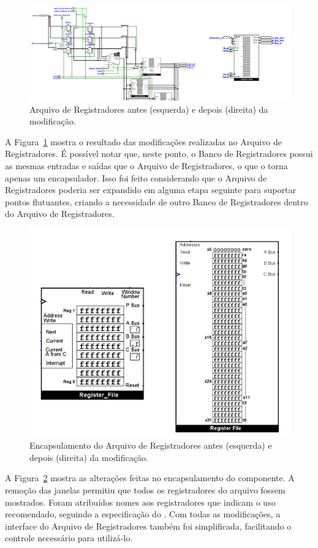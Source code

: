 \documentclass[
	12pt,				%
	openright,			%
	oneside,			%
	a4paper,			%
	english,			%
	french,				%
	spanish,			%
	brazil,				%
	]{abntex2}
\begin{document}
\begin{figure}[ht]
    \centering
    \includegraphics[width=1\linewidth]{ProcessoDesenvolvimento/Arquitetura/RegisterFile.png}
    \caption{Arquivo de Registradores antes (esquerda) e depois (direita) da modificação.}
    \label{fig:desenvolvimento_register_file}
\end{figure}

A Figura~\ref{fig:desenvolvimento_register_file} mostra o resultado das modificações realizadas no Arquivo de Registradores. É possível notar que, neste ponto, o Banco de Registradores possui as mesmas entradas e saídas que o Arquivo de Registradores, o que o torna apenas um encapsulador. Isso foi feito considerando que o Arquivo de Registradores poderia ser expandido em alguma etapa seguinte para suportar pontos flutuantes, criando a necessidade de outro Banco de Registradores dentro do Arquivo de Registradores.

\begin{figure}[h]
    \centering
    \includegraphics[width=0.5\linewidth]{ProcessoDesenvolvimento/Arquitetura/RegisterFileComponent.png}
    \caption{Encapsulamento do Arquivo de Registradores antes (esquerda) e depois (direita) da modificação.}
    \label{fig:desenvolvimento_register_file_component}
\end{figure}

A Figura~\ref{fig:desenvolvimento_register_file_component} mostra as alterações feitas no encapsulamento do componente. A remoção das janelas permitiu que todos os registradores do arquivo fossem mostrados. Foram atribuídos nomes aos registradores que indicam o uso recomendado, seguindo a especificação do . Com todas as modificações, a interface do Arquivo de Registradores também foi simplificada, facilitando o controle necessário para utilizá-lo.
\end{document}
